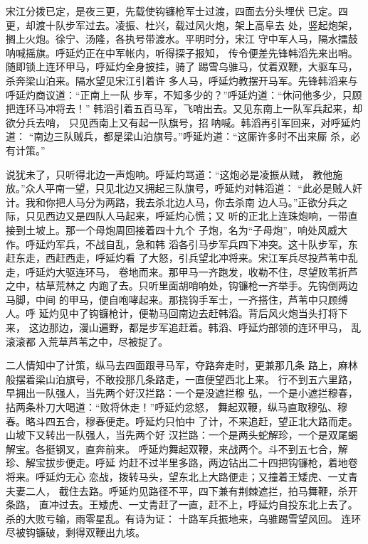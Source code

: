 宋江分拨已定，是夜三更，先载使钩镰枪军士过渡，四面去分头埋伏
已定。四更，却渡十队步军过去。凌振、杜兴，载过风火炮，架上高阜去
处，竖起炮架，搁上火炮。徐宁、汤隆，各执号带渡水。平明时分，宋江
守中军人马，隔水擂鼓呐喊摇旗。呼延灼正在中军帐内，听得探子报知，
传令便差先锋韩滔先来出哨。随即锁上连环甲马，呼延灼全身披挂，骑了
踢雪乌骓马，仗着双鞭，大驱车马，杀奔梁山泊来。隔水望见宋江引着许
多人马，呼延灼教摆开马军。先锋韩滔来与呼延灼商议道：“正南上一队
步军，不知多少的？”呼延灼道：“休问他多少，只顾把连环马冲将去！”
韩滔引着五百马军，飞哨出去。又见东南上一队军兵起来，却欲分兵去哨，
只见西南上又有起一队旗号，招呐喊。韩滔再引军回来，对呼延灼道：
“南边三队贼兵，都是梁山泊旗号。”呼延灼道：“这厮许多时不出来厮
杀，必有计策。”

说犹未了，只听得北边一声炮响。呼延灼骂道：“这炮必是凌振从贼，
教他施放。”众人平南一望，只见北边又拥起三队旗号，呼延灼对韩滔道：
“此必是贼人奸计。我和你把人马分为两路，我去杀北边人马，你去杀南
边人马。”正欲分兵之际，只见西边又是四队人马起来，呼延灼心慌；又
听的正北上连珠炮响，一带直接到土坡上。那一个母炮周回接着四十九个
子炮，名为“子母炮”，响处风威大作。呼延灼军兵，不战自乱，急和韩
滔各引马步军兵四下冲突。这十队步军，东赶东走，西赶西走，呼延灼看
了大怒，引兵望北冲将来。宋江军兵尽投芦苇中乱走，呼延灼大驱连环马，
卷地而来。那甲马一齐跑发，收勒不住，尽望败苇折芦之中，枯草荒林之
内跑了去。只听里面胡哨响处，钩镰枪一齐举手。先钩倒两边马脚，中间
的甲马，便自咆哮起来。那挠钩手军士，一齐搭住，芦苇中只顾缚人。呼
延灼见中了钩镰枪计，便勒马回南边去赶韩滔。背后风火炮当头打将下来，
这边那边，漫山遍野，都是步军追赶着。韩滔、呼延灼部领的连环甲马，
乱滚滚都入荒草芦苇之中，尽被捉了。

二人情知中了计策，纵马去四面跟寻马军，夺路奔走时，更兼那几条
路上，麻林般摆着梁山泊旗号，不敢投那几条路走，一直便望西北上来。
行不到五六里路，早拥出一队强人，当先两个好汉拦路：一个是没遮拦穆
弘，一个是小遮拦穆春，拈两条朴刀大喝道：“败将休走！”呼延灼忿怒，
舞起双鞭，纵马直取穆弘、穆春。略斗四五合，穆春便走。呼延灼只怕中
了计，不来追赶，望正北大路而走。山坡下又转出一队强人，当先两个好
汉拦路：一个是两头蛇解珍，一个是双尾蝎解宝。各挺钢叉，直奔前来。
呼延灼舞起双鞭，来战两个。斗不到五七合，解珍、解宝拔步便走。呼延
灼赶不过半里多路，两边钻出二十四把钩镰枪，着地卷将来。呼延灼无心
恋战，拨转马头，望东北上大路便走；又撞着王矮虎、一丈青夫妻二人，
截住去路。呼延灼见路径不平，四下兼有荆棘遮拦，拍马舞鞭，杀开条路，
直冲过去。王矮虎、一丈青赶了一直，赶不上，呼延灼自投东北上去了。
杀的大败亏输，雨零星乱。有诗为证：
十路军兵振地来，乌骓踢雪望风回。
连环尽被钩镰破，剩得双鞭出九垓。

